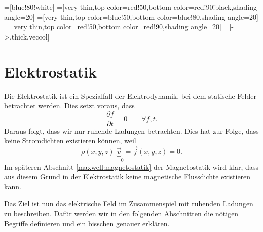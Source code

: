%
%
%
%

\tikzset{>=latex} %
\usetikzlibrary {arrows.meta}
\pgfplotsset{compat=1.13}
\usetikzlibrary{decorations.markings,intersections,calc}
\usetikzlibrary{angles,quotes} %
=[blue!80!white]
=[very thin,top color=red!50,bottom color=red!90!black,shading angle=20]
=[very thin,top color=blue!50,bottom color=blue!80,shading angle=20]
 = [very thin,top color=red!50,bottom color=red!90,shading angle=20]
=[->,thick,veccol]


\section{Elektrostatik\label{maxwell:section:elekktrostatik}}
Die Elektrostatik ist ein Spezialfall der Elektrodynamik, bei dem statische Felder betrachtet werden.
Dies setzt voraus, dass
\begin{equation}
	\frac{\partial f}{\partial t}
	=
	0
	\qquad
	\forall f,t.
	\label{maxwell:section:definition_statik}
\end{equation}
Daraus folgt, dass wir nur ruhende Ladungen betrachten.
Dies hat zur Folge, dass keine Stromdichten existieren können, weil
\begin{equation}
	\rho(x,y,z) \underbrace{\vec{v}}_{=0}
	=
	\vec{j}(x,y,z)
	=
	0.
\end{equation}
Im späteren Abschnitt \ref{maxwell:magnetostatik} der Magnetostatik wird klar, dass aus diesem Grund in der Elektrostatik keine magnetische Flussdichte existieren kann.
 
Das Ziel ist nun das elektrische Feld im Zusammenspiel mit ruhenden Ladungen zu beschreiben.
Dafür werden wir in den folgenden Abschnitten die nötigen Begriffe definieren und ein bisschen genauer erklären.

